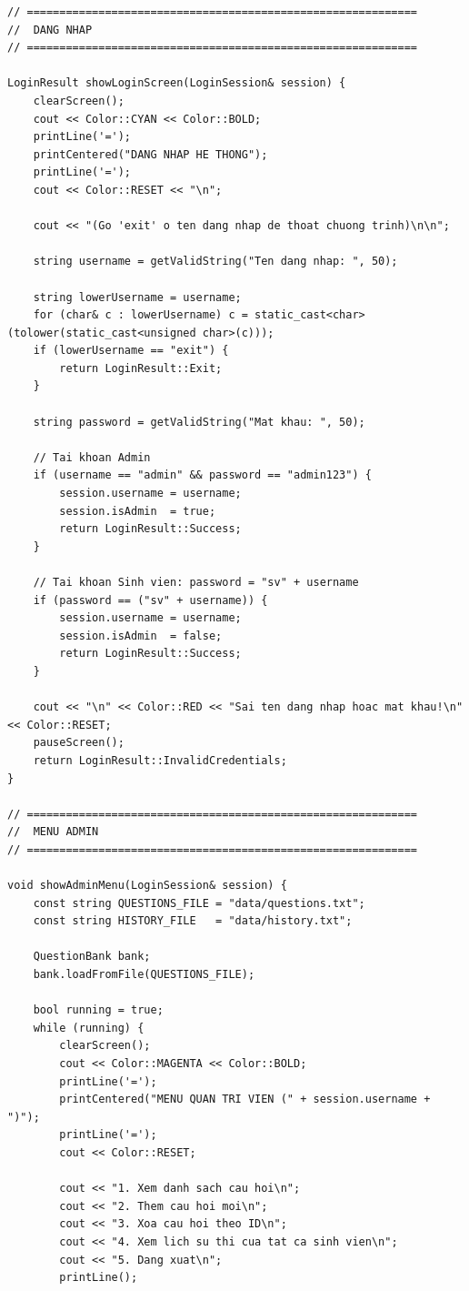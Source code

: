 \documentclass[11pt]{report}
\begin{document}
\begin{lstlisting}[caption={Menu.cpp -- Cài đặt giao diện Menu và điều hướng}, label={lst:full_menu_cpp}]
// ============================================================
//  DANG NHAP
// ============================================================

LoginResult showLoginScreen(LoginSession& session) {
    clearScreen();
    cout << Color::CYAN << Color::BOLD;
    printLine('=');
    printCentered("DANG NHAP HE THONG");
    printLine('=');
    cout << Color::RESET << "\n";

    cout << "(Go 'exit' o ten dang nhap de thoat chuong trinh)\n\n";

    string username = getValidString("Ten dang nhap: ", 50);

    string lowerUsername = username;
    for (char& c : lowerUsername) c = static_cast<char>(tolower(static_cast<unsigned char>(c)));
    if (lowerUsername == "exit") {
        return LoginResult::Exit;
    }

    string password = getValidString("Mat khau: ", 50);

    // Tai khoan Admin
    if (username == "admin" && password == "admin123") {
        session.username = username;
        session.isAdmin  = true;
        return LoginResult::Success;
    }

    // Tai khoan Sinh vien: password = "sv" + username
    if (password == ("sv" + username)) {
        session.username = username;
        session.isAdmin  = false;
        return LoginResult::Success;
    }

    cout << "\n" << Color::RED << "Sai ten dang nhap hoac mat khau!\n" << Color::RESET;
    pauseScreen();
    return LoginResult::InvalidCredentials;
}

// ============================================================
//  MENU ADMIN
// ============================================================

void showAdminMenu(LoginSession& session) {
    const string QUESTIONS_FILE = "data/questions.txt";
    const string HISTORY_FILE   = "data/history.txt";

    QuestionBank bank;
    bank.loadFromFile(QUESTIONS_FILE);

    bool running = true;
    while (running) {
        clearScreen();
        cout << Color::MAGENTA << Color::BOLD;
        printLine('=');
        printCentered("MENU QUAN TRI VIEN (" + session.username + ")");
        printLine('=');
        cout << Color::RESET;

        cout << "1. Xem danh sach cau hoi\n";
        cout << "2. Them cau hoi moi\n";
        cout << "3. Xoa cau hoi theo ID\n";
        cout << "4. Xem lich su thi cua tat ca sinh vien\n";
        cout << "5. Dang xuat\n";
        printLine();


\end{lstlisting}
\end{document}
